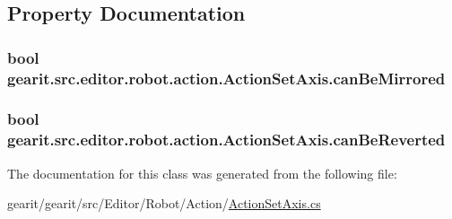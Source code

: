 \subsection{Property Documentation}
\hypertarget{classgearit_1_1src_1_1editor_1_1robot_1_1action_1_1_action_set_axis_a4fd26447a0ebefbe8098d241df37bffb}{
\subsubsection[{can\+Be\+Mirrored}]{\setlength{\rightskip}{0pt plus 5cm}bool gearit.\+src.\+editor.\+robot.\+action.\+Action\+Set\+Axis.\+can\+Be\+Mirrored\hspace{0.3cm}{\ttfamily [get]}}}\label{classgearit_1_1src_1_1editor_1_1robot_1_1action_1_1_action_set_axis_a4fd26447a0ebefbe8098d241df37bffb}
\hypertarget{classgearit_1_1src_1_1editor_1_1robot_1_1action_1_1_action_set_axis_ae9fb63888ef94a5e03f0cd92336b64f5}{
\subsubsection[{can\+Be\+Reverted}]{\setlength{\rightskip}{0pt plus 5cm}bool gearit.\+src.\+editor.\+robot.\+action.\+Action\+Set\+Axis.\+can\+Be\+Reverted\hspace{0.3cm}{\ttfamily [get]}}}\label{classgearit_1_1src_1_1editor_1_1robot_1_1action_1_1_action_set_axis_ae9fb63888ef94a5e03f0cd92336b64f5}


The documentation for this class was generated from the following file\+:\begin{DoxyCompactItemize}
\item 
gearit/gearit/src/\+Editor/\+Robot/\+Action/\hyperlink{_action_set_axis_8cs}{Action\+Set\+Axis.\+cs}\end{DoxyCompactItemize}
